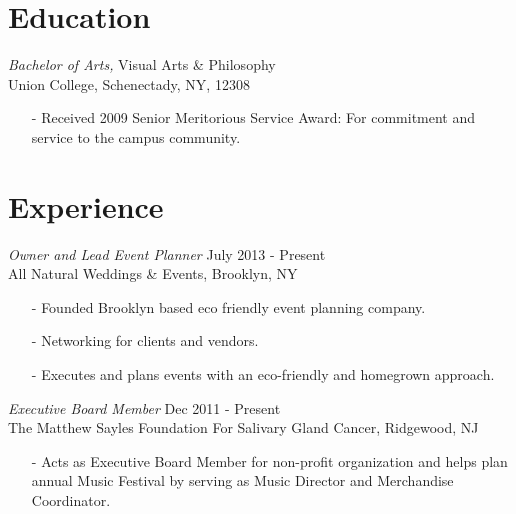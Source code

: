 \documentclass[margin, 5pt]{res} %
\begin{document}
\begin{resume}


\vspace{-10pt}
\section{Education} \vspace{15pt}
{\sl Bachelor of Arts,} Visual Arts \& Philosophy \\
Union College, Schenectady, NY, 12308 \\
\vspace{-10pt}
\begin{itemize} \itemsep 0pt
\item[-] Received 2009 Senior Meritorious Service Award: For commitment and service to the campus community.
\end{itemize}
 
 
\section{Experience} \vspace{15pt}
{\sl Owner and Lead Event Planner} \hfill July 2013 - Present\\
All Natural Weddings \& Events, Brooklyn, NY
\begin{itemize} \itemsep 0pt
\item[-] Founded Brooklyn based eco friendly event planning company.
\item[-] Networking for clients and vendors.
\item[-] Executes and plans events with an eco-friendly and homegrown approach.
\end{itemize}

{\sl Executive Board Member} \hfill Dec 2011 - Present\\
The Matthew Sayles Foundation For Salivary Gland Cancer, Ridgewood, NJ
\begin{itemize} \itemsep 0pt
\item[-] Acts as Executive Board Member for non-profit organization and helps plan annual Music Festival by serving as Music Director and Merchandise Coordinator. 
\end{itemize}


\end{resume}
\end{document}
